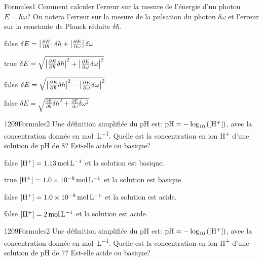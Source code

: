 		\begin{question}{}{Formules}{1}{}
			Comment calculer l'erreur sur la mesure de l'énergie d'un photon $E=\hbar\omega$? On notera l'erreur sur la mesure de la pulsation du photon $\delta\omega$ et l'erreur sur la constante de Planck réduite $\delta\hbar$.
        \end{question}
        \begin{reponses}
    	    \item[false] $\delta E = \left|{\frac{\partial E}{\partial \hbar}}\right|\delta \hbar+\left|{\frac{\partial E}{\partial \omega}}\right|\delta \omega$
		    \item[true] $\delta E = \sqrt{\left|{\frac{\partial E}{\partial \hbar}\delta \hbar}\right|^2+\left|{\frac{\partial E}{\partial \omega}\delta \omega}\right|^2}$
		    \item[false] $\delta E = \sqrt{\left|{\frac{\partial E}{\partial \hbar}\delta \hbar}\right|^2-\left|{\frac{\partial E}{\partial \omega}\delta \omega}\right|^2}$
		    \item[false] $\delta E = \sqrt{\frac{\partial E}{\partial \hbar}\delta \hbar^2+\frac{\partial E}{\partial \omega}\delta \omega^2}$
        \end{reponses}
        \begin{question}{1209}{Formules}{2}{}
			Une définition simplifiée du pH est: $\text{pH} = -\log_{10}\left(\text{[H\textsuperscript{+}]}\right)$, avec la concentration donnée en \si{\mol\per\liter}. Quelle est la concentration en ion H\textsuperscript{+} d'une solution de pH de 8? Est-elle acide ou basique?
        \end{question}
        \begin{reponses}
    	    \item[false] $\text{[H\textsuperscript{+}]} = \SI{1.13}{\mol\per\liter}$ et la solution est basique.
    	    \item[true] $\text{[H\textsuperscript{+}]} = \SI{1.0e-8}{\mol\per\liter}$ et la solution est basique.
    	    \item[false] $\text{[H\textsuperscript{+}]} = \SI{1.0e-8}{\mol\per\liter}$ et la solution est acide.
    	    \item[false] $\text{[H\textsuperscript{+}]} = \SI{2}{\mol\per\liter}$ et la solution est acide.
        \end{reponses}
        \begin{question}{1209}{Formules}{2}{}
			Une définition simplifiée du pH est: $\text{pH} = -\log_{10}\left(\text{[H\textsuperscript{+}]}\right)$, avec la concentration donnée en \si{\mol\per\liter}. Quelle est la concentration en ion H\textsuperscript{+} d'une solution de pH de 7? Est-elle acide ou basique?
        \end{question}
